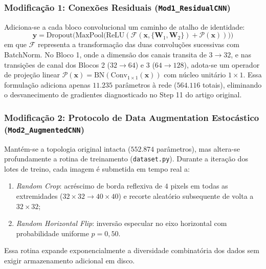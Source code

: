 \documentclass[runningheads]{llncs}
\begin{document}
\subsubsection{Modifica\c{c}\~{a}o 1: Conex\~{o}es Residuais (\texttt{Mod1\_ResidualCNN})}
Adiciona-se a cada bloco convolucional um caminho de atalho de identidade:
\begin{equation}
    \mathbf{y} = \text{Dropout}\Big(\text{MaxPool}\big(\text{ReLU}(\mathcal{F}(\mathbf{x}, \{\mathbf{W}_1, \mathbf{W}_2\}) + \mathcal{P}(\mathbf{x}))\big)\Big)
    \label{eq:residual}
\end{equation}
em que $\mathcal{F}$ representa a transforma\c{c}\~{a}o das duas convolu\c{c}\~{o}es sucessivas com BatchNorm. No Bloco 1, onde a dimens\~{a}o dos canais transita de $3 \to 32$, e nas transi\c{c}\~{o}es de canal dos Blocos 2 ($32 \to 64$) e 3 ($64 \to 128$), adota-se um operador de proje\c{c}\~{a}o linear $\mathcal{P}(\mathbf{x}) = \text{BN}(\text{Conv}_{1 \times 1}(\mathbf{x}))$ com n\'{u}cleo unit\'{a}rio $1 \times 1$. Essa formula\c{c}\~{a}o adiciona apenas $11.235$ par\^{a}metros \`{a} rede ($564.116$ totais), eliminando o desvanecimento de gradientes diagnosticado no Step 11 do artigo original.

\subsubsection{Modifica\c{c}\~{a}o 2: Protocolo de Data Augmentation Estoc\'{a}stico (\texttt{Mod2\_AugmentedCNN})}
Mant\'{e}m-se a topologia original intacta ($552.874$ par\^{a}metros), mas altera-se profundamente a rotina de treinamento (\texttt{dataset.py}). Durante a itera\c{c}\~{a}o dos lotes de treino, cada imagem \'{e} submetida em tempo real a:
\begin{enumerate}
    \item \textit{Random Crop}: acr\'{e}scimo de borda reflexiva de $4$ pixels em todas as extremidades ($32 \times 32 \to 40 \times 40$) e recorte aleat\'{o}rio subsequente de volta a $32 \times 32$;
    \item \textit{Random Horizontal Flip}: invers\~{a}o especular no eixo horizontal com probabilidade uniforme $p = 0{,}50$.
\end{enumerate}
Essa rotina expande exponencialmente a diversidade combinat\'{o}ria dos dados sem exigir armazenamento adicional em disco.
\end{document}
